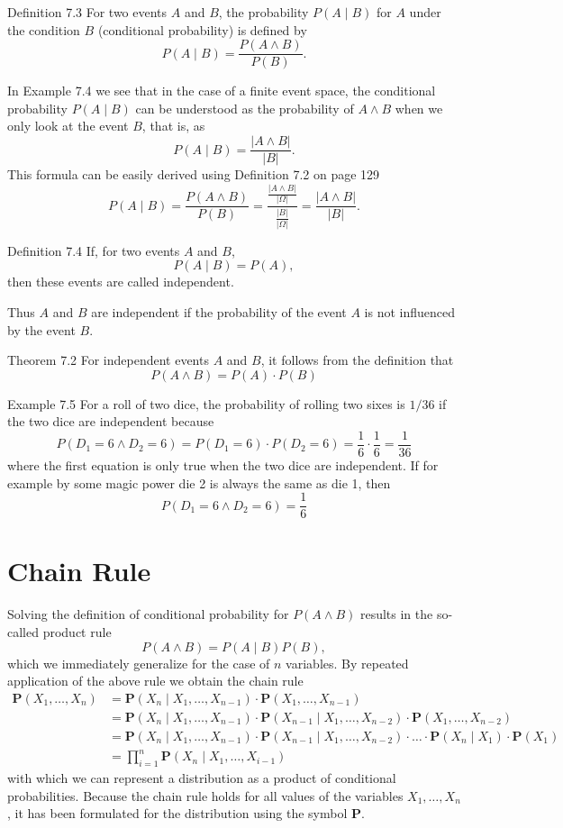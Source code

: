 \documentclass[10pt]{book}
\begin{document}
Definition 7.3 For two events $A$ and $B$, the probability $P(A \mid B)$ for $A$ under the condition $B$ (conditional probability) is defined by
$$
P(A \mid B)=\frac{P(A \wedge B)}{P(B)} .
$$

In Example 7.4 we see that in the case of a finite event space, the conditional probability $P(A \mid B)$ can be understood as the probability of $A \wedge B$ when we only look at the event $B$, that is, as
$$
P(A \mid B)=\frac{|A \wedge B|}{|B|} .
$$
This formula can be easily derived using Definition 7.2 on page 129
$$
P(A \mid B)=\frac{P(A \wedge B)}{P(B)}=\frac{\frac{|A \wedge B|}{|\Omega|}}{\frac{|B|}{|\Omega|}}=\frac{|A \wedge B|}{|B|} .
$$

Definition 7.4 If, for two events $A$ and $B$,
$$
P(A \mid B)=P(A),
$$
then these events are called independent.

Thus $A$ and $B$ are independent if the probability of the event $A$ is not influenced by the event $B$.

Theorem 7.2 For independent events $A$ and $B$, it follows from the definition that
$$
P(A \wedge B)=P(A) \cdot P(B)
$$

Example 7.5 For a roll of two dice, the probability of rolling two sixes is $1 / 36$ if the two dice are independent because
$$
P\left(D_{1}=6 \wedge D_{2}=6\right)=P\left(D_{1}=6\right) \cdot P\left(D_{2}=6\right)=\frac{1}{6} \cdot \frac{1}{6}=\frac{1}{36}
$$
where the first equation is only true when the two dice are independent. If for example by some magic power die 2 is always the same as die 1, then
$$
P\left(D_{1}=6 \wedge D_{2}=6\right)=\frac{1}{6}
$$

\section{Chain Rule}
Solving the definition of conditional probability for $P(A \wedge B)$ results in the so-called product rule
$$
P(A \wedge B)=P(A \mid B) P(B),
$$
which we immediately generalize for the case of $n$ variables. By repeated application of the above rule we obtain the chain rule
\begin{align*}
\boldsymbol{P}\left(X_{1}, \ldots, X_{n}\right)
&=\boldsymbol{P}\left(X_{n} \mid X_{1}, \ldots, X_{n-1}\right) \cdot \boldsymbol{P}\left(X_{1}, \ldots, X_{n-1}\right) \\
&=\boldsymbol{P}\left(X_{n} \mid X_{1}, \ldots, X_{n-1}\right) \cdot \boldsymbol{P}\left(X_{n-1} \mid X_{1}, \ldots, X_{n-2}\right) \cdot \boldsymbol{P}\left(X_{1}, \ldots, X_{n-2}\right) \\
&=\boldsymbol{P}\left(X_{n} \mid X_{1}, \ldots, X_{n-1}\right) \cdot \boldsymbol{P}\left(X_{n-1} \mid X_{1}, \ldots, X_{n-2}\right) \cdot \ldots \cdot \boldsymbol{P}\left(X_{n} \mid X_{1}\right) \cdot \boldsymbol{P}\left(X_{1}\right) \\
&=\prod_{i=1}^{n} \boldsymbol{P}\left(X_{n} \mid X_{1}, \ldots, X_{i-1}\right) \tag{7.1}
\end{align*}
with which we can represent a distribution as a product of conditional probabilities. Because the chain rule holds for all values of the variables $X_{1}, \ldots, X_{n}$, it has been formulated for the distribution using the symbol $\boldsymbol{P}$.
\end{document}
